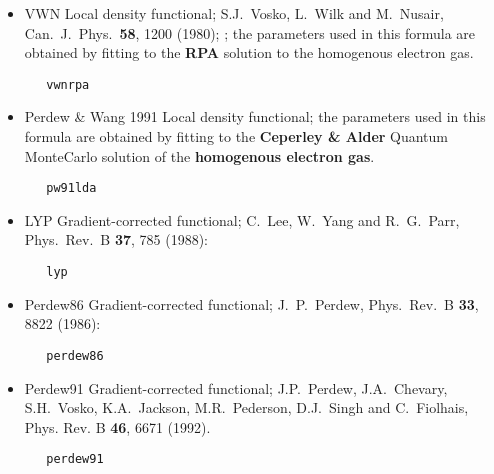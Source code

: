 \begin{itemize}
\item VWN Local density functional; S.J.~Vosko, L.~Wilk and M.~Nusair, 
  Can.~J.~Phys.~{\bf  58}, 1200 (1980); ; the parameters used in this
  formula are obtained by fitting to the {\bf RPA} solution to the
  homogenous electron gas.
\begin{verbatim}
   vwnrpa
\end{verbatim}
\item Perdew \& Wang 1991 Local density functional; the parameters used in this
  formula are obtained by fitting to the {\bf Ceperley \&
  Alder\footnotemark[1]} Quantum
  MonteCarlo solution of the {\bf homogenous electron gas}.
\begin{verbatim}
   pw91lda
\end{verbatim}
\item LYP Gradient-corrected functional; 
  C.~Lee, W.~Yang and R.~G.~Parr, Phys.~Rev.~B {\bf 37}, 785 (1988):
\begin{verbatim}
   lyp
\end{verbatim}
\item Perdew86 Gradient-corrected functional; J.~P.~Perdew, Phys.~Rev.~B 
  {\bf33}, 8822 (1986):
\begin{verbatim}
   perdew86
\end{verbatim}
\item Perdew91 Gradient-corrected functional;  J.P.~Perdew,
  J.A.~Chevary, S.H.~Vosko, K.A.~Jackson, M.R.~Pederson, D.J.~Singh and C.~Fiolhais,
Phys. Rev. B {\bf 46}, 6671 (1992).

\begin{verbatim}
   perdew91
\end{verbatim}
\end{itemize}

